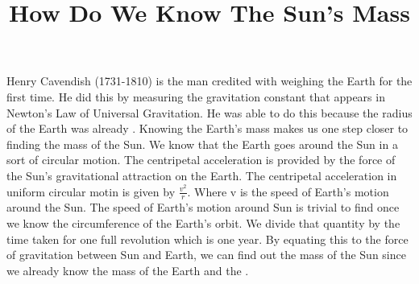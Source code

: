 \documentclass{../template/texnote}
\title{How Do We Know The Sun's Mass}
\begin{document}
    \maketitle {}
Henry Cavendish (1731-1810) is the man credited with weighing the Earth for the first time.
He did this by measuring the gravitation constant that appears in Newton's Law of Universal Gravitation.
He was able to do this because the radius of the Earth was already .
Knowing the Earth's mass makes us one step closer to finding the mass of the Sun.
We know that the Earth goes around the Sun in a sort of circular motion. The centripetal acceleration is provided by the force of the Sun's gravitational attraction on the Earth.
The centripetal acceleration in uniform circular motin is given by $\frac{v^2}{r}$. Where v is the speed of Earth's motion around the Sun. The speed of Earth's motion around Sun is trivial to find once we know the circumference of the Earth's orbit. We divide that quantity by the time taken for one full revolution which is one year.
By equating this to the force of gravitation between Sun and Earth, we can find out the mass of the Sun since we already know the mass of the Earth and the .

    \printbibliography
\end{document}
